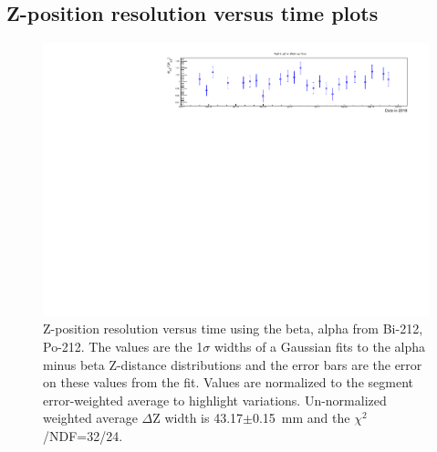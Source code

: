 \subsection{Z-position resolution versus time plots}
\begin{figure}[!h]
\centering
\includegraphics[width=1.05\textwidth]{figures/PubBiPo212ZresvsT.pdf}
\caption{\label{fig:ZresvsT212}Z-position resolution versus time using the beta, alpha from Bi-212, Po-212. The values are the 1$\sigma$ widths of a Gaussian fits to the alpha minus beta Z-distance distributions and the error bars are the error on these values from the fit. Values are normalized to the segment error-weighted average to highlight variations. Un-normalized weighted average $\Delta$Z width is 43.17$\pm$0.15~mm and the $\chi^2$/NDF=32/24.}
\end{figure}
